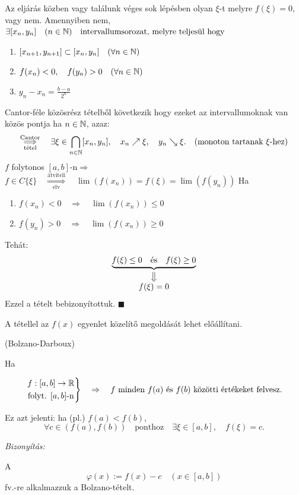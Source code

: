 \documentclass[a4paper,11.5pt]{article}
\begin{document}
\begin{theorem}
		\medskip
		Az eljárás közben vagy találunk véges sok lépésben olyan  $\xi$-t melyre $f(\xi)=0$, vagy nem. Amennyiben nem,
		$\exists[x_n,y_n]\quad (n\in\mathbb{N}) \quad \text{intervallumsorozat, melyre teljesül hogy}$
		\begin{enumerate}
			\item $[x_{n+1}, y_{n+1}]\subset[x_n,y_n]\quad (\forall n\in\mathbb{N})$
			\item $f(x_n)<0,\quad f(y_n)>0\quad (\forall n\in\mathbb{N})$
			\item $y_n-x_n=\displaystyle \frac{b-a}{2^n}$
		\end{enumerate}
		Cantor-féle közösrész tételből következik hogy ezeket az intervallumoknak van közös pontja ha $n\in\mathbb{N}$, azaz:
		\[ \overset{\text{Cantor}}{\underset{\text{tétel}}{\Longrightarrow}}\quad \exists\xi\in\bigcap_{n\in\mathbb{N}}[x_n,y_n],\quad x_n\nearrow\xi, \quad y_n\searrow\xi. \quad (\text{monoton tartanak $\xi$-hez})\]
		$f$ folytonos $[a,b]$-n\quad $\Rightarrow$ \quad $f\in C\{\xi \} \quad \overset{\text{átviteli}}{\underset{\text{elv}}{\Longrightarrow}}\quad \lim(f(x_n))=f(\xi)=\lim(f(y_n))$
		Ha
		\begin{enumerate}
			\item $f(x_n)< 0\quad \Rightarrow\quad \lim(f(x_n))\leq0$
			\item $f(y_n)>0\quad \Rightarrow\quad \lim(f(x_n))\geq 0$
		\end{enumerate}
		Tehát:
		\[\underbrace{f(\xi)\leq 0 \quad \text{és}\quad f(\xi)\geq0}_{\substack{\big\Downarrow\\\displaystyle f(\xi)=0}}\]
		Ezzel a tételt bebizonyítottuk. \quad $\blacksquare$
	\end{theorem}
	\begin{note}
		A tétellel az $f(x)$ egyenlet közelítő megoldását lehet előállítani.
	\end{note}
	\begin{theorem}
		(Bolzano-Darboux)
		
		Ha 
		
		\[\left.\begin{gathered}
		f:[a,b]\rightarrow\mathbb{R}\\
		\text{folyt. } [a,b]\text{-n}
		\end{gathered}\right\}\quad \Rightarrow\quad f \text{ minden } f(a)\text{ és }f(b) \text{ közötti értékeket felvesz.}\]
		\begin{note}
			Ez azt jelenti: ha (pl.) $f(a)<f(b)$,
			\[ \forall c\in(f(a),f(b)) \quad \text{ponthoz}\quad \exists\xi\in[a,b],\quad f(\xi)=c. \]
		\end{note}
		\textit{Bizonyítás:}
		
		A \[\varphi(x):=f(x)-c\quad (x\in[a,b])\] fv.-re alkalmazzuk a Bolzano-tételt.
	\end{theorem}
\end{document}
